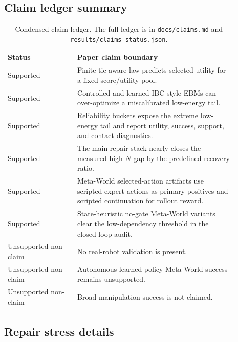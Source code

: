 \subsection{Claim ledger summary}

\begin{table}[htbp]
\centering
\small
\setlength{\tabcolsep}{4pt}
\begin{tabular}{p{0.27\linewidth}p{0.62\linewidth}}
\toprule
Status & Paper claim boundary \\
\midrule
Supported & Finite tie-aware law predicts selected utility for a fixed score/utility pool. \\
Supported & Controlled and learned IBC-style EBMs can over-optimize a miscalibrated low-energy tail. \\
Supported & Reliability buckets expose the extreme low-energy tail and report utility, success, support, and contact diagnostics. \\
Supported & The main repair stack nearly closes the measured high-\(N\) gap by the predefined recovery ratio. \\
Supported & Meta-World selected-action artifacts use scripted expert actions as primary positives and scripted continuation for rollout reward. \\
Supported & State-heuristic no-gate Meta-World variants clear the low-dependency threshold in the closed-loop audit. \\
Unsupported non-claim & No real-robot validation is present. \\
Unsupported non-claim & Autonomous learned-policy Meta-World success remains unsupported. \\
Unsupported non-claim & Broad manipulation success is not claimed. \\
\bottomrule
\end{tabular}
\caption{Condensed claim ledger. The full ledger is in \texttt{docs/claims.md} and \texttt{results/claims\_status.json}.}
\label{tab:claim-ledger}
\end{table}

\subsection{Repair stress details}

